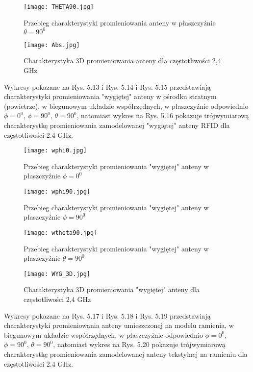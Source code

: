 \newpage

\begin{figure}[H]
\centering
	\texttt{[image: THETA90.jpg]}
	\caption{Przebieg charakterystyki promieniowania anteny w płaszczyźnie $\theta = 90^{0}$}
\end{figure}



\begin{figure}[H]
\centering
	\texttt{[image: Abs.jpg]}
	\caption{Charakterystyka 3D promieniowania anteny dla częstotliwości 2,4 GHz}
\end{figure}



Wykresy pokazane na Rys. 5.13 i Rys. 5.14 i Rys. 5.15 przedstawiają charakterystyki promieniowania "wygiętej" anteny w ośrodku stratnym (powietrze), w biegunowym układzie współrzędnych, w płaszczyźnie odpowiednio $\phi = 0^{0}$, $\phi = 90^{0}$, $\theta = 90^{0}$, natomiast wykres na Rys. 5.16 pokazuje trójwymiarową charakterystkę promieniowania zamodelowanej "wygiętej" anteny RFID dla częstotliwości 2.4 GHz.


\begin{figure}[H]
\centering
	\texttt{[image: wphi0.jpg]}
	\caption{Przebieg charakterystyki promieniowania "wygiętej" anteny w płaszczyźnie $\phi = 0^{0}$}
\end{figure}


\begin{figure}[H]
\centering
	\texttt{[image: wphi90.jpg]}
	\caption{Przebieg charakterystyki promieniowania "wygiętej" anteny w płaszczyźnie $\phi = 90^{0}$}
\end{figure}


\noindent
\newline
\begin{figure}[H]
\centering
	\texttt{[image: wtheta90.jpg]}
	\caption{Przebieg charakterystyki promieniowania "wygiętej" anteny w płaszczyźnie $\theta = 90^{0}$}
\end{figure}

\begin{figure}[H]
\centering
	\texttt{[image: WYG\_3D.jpg]}
	\caption{Charakterystyka 3D promieniowania "wygiętej" anteny dla częstotliwości 2,4 GHz}
\end{figure}

Wykresy pokazane na Rys. 5.17 i Rys. 5.18 i Rys. 5.19 przedstawiają charakterystyki promieniowania anteny umieszczonej na modelu ramienia, w biegunowym układzie współrzędnych, w płaszczyźnie odpowiednio $\phi = 0^{0}$, $\phi = 90^{0}$, $\theta = 90^{0}$, natomiast wykres na Rys. 5.20 pokazuje trójwymiarową charakterystkę promieniowania zamodelowanej  anteny tekstylnej na ramieniu dla częstotliwości 2.4 GHz.


